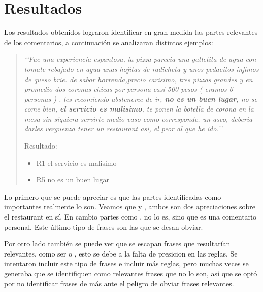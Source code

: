 \section{Resultados}

Los resultados obtenidos lograron identificar en gran medida las partes relevantes de los comentarios, a continuación se analizaran distintos ejemplos:

\begin{quotation}

\emph{
\lq{}\lq{}Fue una experiencia espantosa, la pizza parecia una galletita de agua con tomate rebajado en agua unas hojitas de radicheta y unos pedacitos infimos de queso brie.  de sabor horrenda,precio carisimo, tres pizzas grandes y en promedio dos coronas chicas por persona casi 500 pesos  ( eramos 6 personas ) .  les recomiendo abstenerce de ir, {\bf no es un buen lugar}, no se come bien, {\bf el servicio es malisimo}, te ponen la botella de corona en la mesa sin siquiera servirte medio vaso como corresponde.  un asco, deberia darles verguenza tener un restaurant asi, el peor al que he ido.\rq{}\rq{}
}


Resultado:
\begin{itemize}
\item R1  el servicio es malisimo
\item R5  no es un buen lugar
\end{itemize}

\end{quotation}

Lo primero que se puede apreciar es que las partes identificadas como importantes realmente lo son. Veamos que  y , ambos son dos apreciaciones sobre el restaurant en sí. En cambio partes como , no lo es, sino que es una comentario personal. Este último tipo de frases son las que se desan obviar.

Por otro lado también se puede ver que se escapan frases que resultarían relevantes, como ser  o , esto se debe a la falta de presicion en las reglas. Se intentaron incluir este tipo de frases e incluir más reglas, pero muchas veces se generaba que se identifiquen como relevantes frases que no lo son, así que se optó por no identificar frases de más ante el peligro de obviar frases relevantes.


